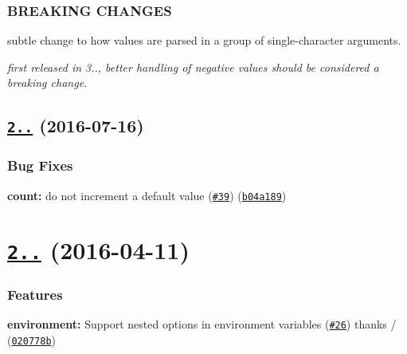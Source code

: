 \subsubsection*{B\+R\+E\+A\+K\+I\+NG C\+H\+A\+N\+G\+ES}


\begin{DoxyItemize}
\item subtle change to how values are parsed in a group of single-\/character arguments.
\item {\itshape first released in 3.., better handling of negative values should be considered a breaking change.}
\end{DoxyItemize}

\label{_2.4.1}%
 \subsection*{\href{https://github.com/yargs/yargs-parser/compare/v2.4.0...v2.4.1}{\tt 2..} (2016-\/07-\/16)}

\subsubsection*{Bug Fixes}


\begin{DoxyItemize}
\item {\bfseries count\+:} do not increment a default value (\href{https://github.com/yargs/yargs-parser/issues/39}{\tt \#39}) (\href{https://github.com/yargs/yargs-parser/commit/b04a189}{\tt b04a189})
\end{DoxyItemize}

\label{_2.4.0}%
 \section*{\href{https://github.com/yargs/yargs-parser/compare/v2.3.0...v2.4.0}{\tt 2..} (2016-\/04-\/11)}

\subsubsection*{Features}


\begin{DoxyItemize}
\item {\bfseries environment\+:} Support nested options in environment variables (\href{https://github.com/yargs/yargs-parser/issues/26}{\tt \#26}) thanks \href{https://github.com/elas7}{\tt } / (\href{https://github.com/yargs/yargs-parser/commit/020778b}{\tt 020778b})
\end{DoxyItemize}

